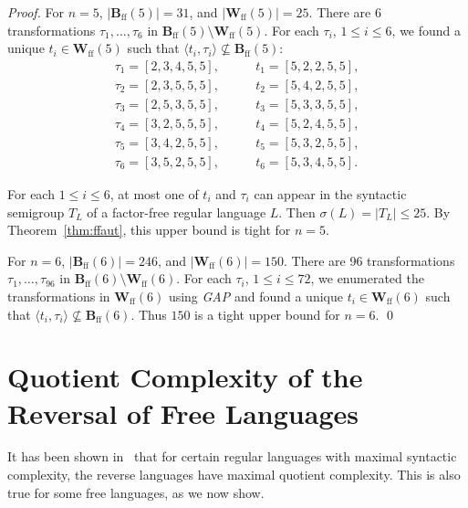 \documentclass{llncs}
\renewcommand{\le}{\leqslant}
\newcommand{\Bff}{\mathbf{B}_{\mathrm{ff}}}
\newcommand{\Wff}{\mathbf{W}_{\mathrm{ff}}}
\begin{document}
\begin{proof} 
For $n = 5$, $|\Bff(5)| = 31$, and $|\Wff(5)| = 25$. There are 6 transformations $\tau_1, \ldots, \tau_{6}$ in $\Bff(5) \setminus \Wff(5)$. For each $\tau_i$, $1 \le i \le 6$, we found a unique $t_i \in \Wff(5)$ such that $\langle t_i, \tau_i \rangle \not\subseteq \Bff(5)$: 
$$\begin{array}{ll}
  \tau_1 = [ 2, 3, 4, 5, 5 ], \quad & \quad t_1 = [ 5, 2, 2, 5, 5 ], \\ 
  \tau_2 = [ 2, 3, 5, 5, 5 ], \quad & \quad t_2 = [ 5, 4, 2, 5, 5 ], \\ 
  \tau_3 = [ 2, 5, 3, 5, 5 ], \quad & \quad t_3 = [ 5, 3, 3, 5, 5 ], \\ 
  \tau_4 = [ 3, 2, 5, 5, 5 ], \quad & \quad t_4 = [ 5, 2, 4, 5, 5 ], \\ 
  \tau_5 = [ 3, 4, 2, 5, 5 ], \quad & \quad t_5 = [ 5, 3, 2, 5, 5 ], \\ 
  \tau_6 = [ 3, 5, 2, 5, 5 ], \quad & \quad t_6 = [ 5, 3, 4, 5, 5 ]. 
\end{array}$$ 

For each $1 \le i \le 6$, at most one of $t_i$ and $\tau_i$ can appear in the syntactic semigroup $T_L$ of a factor-free regular language $L$. Then $\sigma(L) = |T_L| \le 25$. By Theorem~\ref{thm:ffaut}, this upper bound is tight for $n = 5$. 

For $n = 6$, $|\Bff(6)| = 246$, and $|\Wff(6)| = 150$. There are 96 transformations $\tau_1, \ldots, \tau_{96}$ in $\Bff(6) \setminus \Wff(6)$. For each $\tau_i$, $1 \le i \le 72$, we enumerated the transformations in $\Wff(6)$ using \emph{GAP} and found a unique $t_i \in \Wff(6)$ such that $\langle t_i, \tau_i \rangle \not\subseteq \Bff(6)$. Thus $150$ is a tight upper bound for $n = 6$. \qed
\end{proof}



\section{Quotient Complexity of the Reversal of Free Languages}\label{sec:rev}

It has been shown in~\cite{BrYe11} that for certain regular languages with maximal syntactic complexity, the reverse languages have maximal quotient complexity. This is also true for some free languages, as we now show. 
\end{document}
